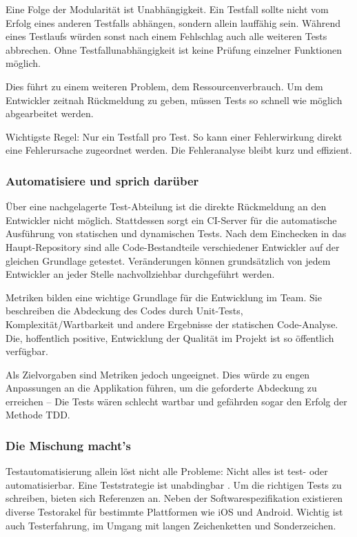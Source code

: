 Eine Folge der Modularität ist Unabhängigkeit. Ein Testfall sollte nicht vom Erfolg eines anderen Testfalls abhängen, sondern allein lauffähig sein. Während eines Testlaufs würden sonst nach einem Fehlschlag auch alle weiteren Tests abbrechen. Ohne Testfallunabhängigkeit ist keine Prüfung einzelner Funktionen möglich.

Dies führt zu einem weiteren Problem, dem Ressourcenverbrauch. Um dem Entwickler zeitnah Rückmeldung zu geben, müssen Tests so schnell wie möglich abgearbeitet werden.

Wichtigste Regel: Nur ein Testfall pro Test. So kann einer Fehlerwirkung direkt eine Fehlerursache zugeordnet werden. Die Fehleranalyse bleibt kurz und effizient.


\subsubsection{Automatisiere und sprich darüber}
Über eine nachgelagerte Test-Abteilung ist die direkte Rückmeldung an den Entwickler nicht möglich. Stattdessen sorgt ein \ac{CI}-Server für die automatische Ausführung von statischen und dynamischen Tests. Nach dem Einchecken in das Haupt-Repository sind alle Code-Bestandteile verschiedener Entwickler auf der gleichen Grundlage getestet. Veränderungen können grundsätzlich von jedem Entwickler an jeder Stelle nachvollziehbar durchgeführt werden.

Metriken bilden eine wichtige Grundlage für die Entwicklung im Team. Sie beschreiben \zB die Abdeckung des Codes durch Unit-Tests, Komplexität/Wartbarkeit und andere Ergebnisse der statischen Code-Analyse. Die, hoffentlich positive, Entwicklung der Qualität im Projekt ist so öffentlich verfügbar. 

Als Zielvorgaben sind Metriken jedoch ungeeignet. Dies würde zu engen Anpassungen an die Applikation führen, um die geforderte Abdeckung zu erreichen -- Die Tests wären schlecht wartbar und gefährden sogar den Erfolg der Methode \ac{TDD}.

\subsubsection{Die Mischung macht's}
Testautomatisierung allein löst nicht alle Probleme: Nicht alles ist test- oder automatisierbar. Eine Teststrategie ist unabdingbar \cite[S.\ 33]{Spillner2014}. Um die richtigen Tests zu schreiben, bieten sich Referenzen an. Neben der Soft\-ware\-spezi\-fi\-kation existieren diverse Testorakel für bestimmte Plattformen wie iOS und Android. Wichtig ist auch Testerfahrung, \zB im Umgang mit langen Zeichenketten und Sonderzeichen.

